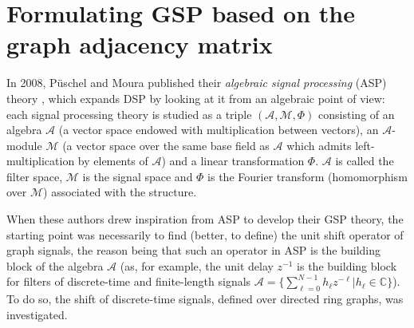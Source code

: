 \section{Formulating GSP based on the graph adjacency matrix}
\label{sec:DSPG}

In 2008, P\"uschel and Moura published their \emph{algebraic signal processing} (ASP) theory \cite{puschel2008time,puschel2008space}, which expands DSP by looking at it from an algebraic point of view: each signal processing theory is studied as a triple $ (\mathscr{A}, \mathscr{M}, \Phi) $ consisting of an algebra $ \mathscr{A} $ (a vector space endowed with multiplication between vectors), an $ \mathscr{A} $-module $ \mathscr{M} $ (a vector space over the same base field as $ \mathscr{A} $ which admits left-multiplication by elements of $ \mathscr{A} $) and a linear transformation $ \Phi $. $ \mathscr{A} $ is called the filter space, $ \mathscr{M} $ is the signal space and $ \Phi $ is the Fourier transform (homomorphism over $ \mathscr{M} $) associated with the structure.

When these authors drew inspiration from ASP to develop their GSP theory, the starting point was necessarily to find (better, to define) the unit shift operator of graph signals, the reason being that such an operator in ASP is the building block of the algebra $ \mathscr{A} $ (as, for example, the unit delay $ z^{-1} $ is the building block for filters of discrete-time and finite-length signals $ \mathscr{A}  = \{ \sum_{\ell=0}^{N-1} h_\ell z^{-\ell} | h_\ell \in \mathbb{C} \}$). To do so, the shift of discrete-time signals, defined over directed ring graphs, was investigated.

